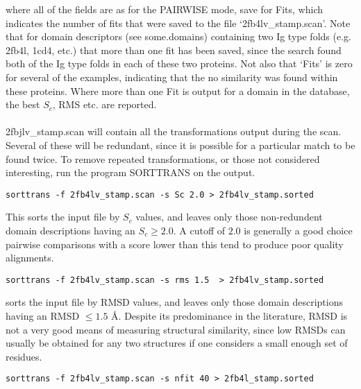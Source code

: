 where all of the fields are as for the PAIRWISE mode, save for Fits, which indicates the 
number of fits that were saved to the file `2fb4lv\_stamp.scan'.  Note that for domain descriptors 
(see some.domains) containing two Ig type folds (e.g. 2fb4l, 1cd4, etc.) that more than
one fit has been saved, since the search found both of the Ig type folds in each of
these two proteins.  Not also that `Fits' is zero for several of the examples,
indicating that the no similarity was found within these proteins.  Where more than one
Fit is output for a domain in the database, the best $S_{c}$, RMS etc. are reported.\\
\\
2fbjlv\_stamp.scan will contain all the transformations output during
the scan.  Several of these will be redundant, since it is possible for a 
particular match to be found twice.  To remove repeated 
transformations, or those not considered interesting, run
the program SORTTRANS on the output.\\

\begin{scriptsize}\begin{verbatim}
sorttrans -f 2fb4lv_stamp.scan -s Sc 2.0 > 2fb4lv_stamp.sorted
\end{verbatim} \end{scriptsize}

This sorts the input file by $S_{c}$ values, and leaves only those non-redundent 
domain descriptions having an $S_{c} \geq 2.0$.  A cutoff of $2.0$ is generally
a good choice pairwise comparisons with a score lower than this tend to produce
poor quality alignments.\\

\begin{scriptsize}\begin{verbatim}
sorttrans -f 2fb4lv_stamp.scan -s rms 1.5  > 2fb4lv_stamp.sorted
\end{verbatim} \end{scriptsize}

sorts the input file by RMSD values, and leaves only those domain
descriptions having an RMSD $\leq 1.5$ \AA.  Despite its predominance in
the literature, RMSD is not a very good means of measuring structural 
similarity, since low RMSDs can usually be obtained for any two structures
if one considers a small enough set of residues.\\


\begin{scriptsize}\begin{verbatim}
sorttrans -f 2fb4lv_stamp.scan -s nfit 40 > 2fb4l_stamp.sorted
\end{verbatim} \end{scriptsize}


